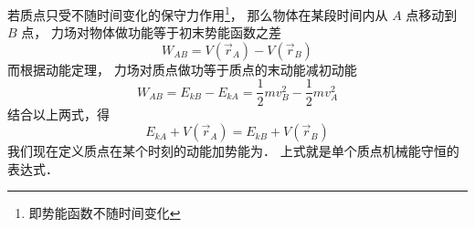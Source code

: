 
若质点只受不随时间变化的保守力作用\footnote{即势能函数不随时间变化}， 那么物体在某段时间内从 $A$ 点移动到 $B$ 点， 力场对物体做功能等于初末势能函数之差
\begin{equation}
W_{AB} = V(\vec r_A) - V(\vec r_B)
\end{equation}
而根据动能定理， 力场对质点做功等于质点的末动能减初动能
\begin{equation}
W_{AB} = E_{kB} - E_{kA} = \frac12 m v_B^2 - \frac12 m v_A^2
\end{equation}
结合以上两式，得
\begin{equation}
E_{kA} + V(\vec r_A) = E_{kB} + V(\vec r_B)
\end{equation}
我们现在定义质点在某个时刻的动能加势能为． 上式就是单个质点机械能守恒的表达式．
